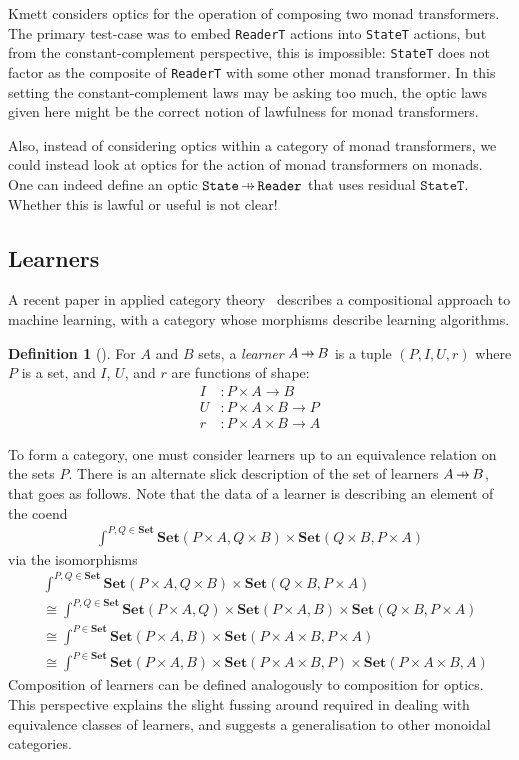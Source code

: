 \documentclass[11pt,letterpaper]{article}
\theoremstyle{plain}
\theoremstyle{definition}
\newtheorem{definition}[theorem]{Definition}
\newcommand{\Set}{\mathbf{Set}}
\newcommand{\hto}{\ensuremath{\,\mathaccent\shortmid\rightarrow\,}}
\begin{document}
Kmett considers optics for the operation of composing two monad transformers. The primary test-case was to embed \texttt{ReaderT} actions into \texttt{StateT} actions, but from the constant-complement perspective, this is impossible: \texttt{StateT} does not factor as the composite of \texttt{ReaderT} with some other monad transformer. In this setting the constant-complement laws may be asking too much, the optic laws given here might be the correct notion of lawfulness for monad transformers.

Also, instead of considering optics within a category of monad transformers, we could instead look at optics for the action of monad transformers on monads. One can indeed define an optic $\texttt{State} \hto \texttt{Reader}$ that uses residual $\texttt{StateT}$. Whether this is lawful or useful is not clear!

\subsection{Learners}
A recent paper in applied category theory~\cite{BackpropAsFunctor} describes a compositional approach to machine learning, with a category whose morphisms describe learning algorithms.

\begin{definition}[{\cite[Definition 2.1]{BackpropAsFunctor}}]
For $A$ and $B$ sets, a \emph{learner} $A \hto B$ is a tuple $(P, I, U, r)$ where $P$ is a set, and $I$, $U$, and $r$ are functions of shape:
\begin{align*}
I &: P \times A \to B \\
U &: P \times A \times B \to P \\
r &: P \times A \times B \to A
\end{align*}
\end{definition}
To form a category, one must consider learners up to an equivalence relation on the sets $P$. There is an alternate slick description of the set of learners $A \hto B$, that goes as follows. Note that the data of a learner is describing an element of the coend
\begin{align*}
\int^{P, Q \in \Set} \Set(P \times A, Q \times B) \times \Set(Q \times B, P \times A)
\end{align*}
via the isomorphisms
\begin{align*}
&\int^{P, Q \in \Set} \Set(P \times A, Q \times B) \times \Set(Q \times B, P \times A) \\
&\cong \int^{P, Q \in \Set} \Set(P \times A, Q) \times \Set(P \times A, B) \times \Set(Q \times B, P \times A) \\
&\cong \int^{P \in \Set} \Set(P \times A, B) \times \Set(P \times A \times B, P \times A) \\
&\cong \int^{P \in \Set} \Set(P \times A, B) \times \Set(P \times A \times B, P) \times \Set(P \times A \times B, A)
\end{align*}
Composition of learners can be defined analogously to composition for optics. This perspective explains the slight fussing around required in dealing with equivalence classes of learners, and suggests a generalisation to other monoidal categories.
\end{document}
